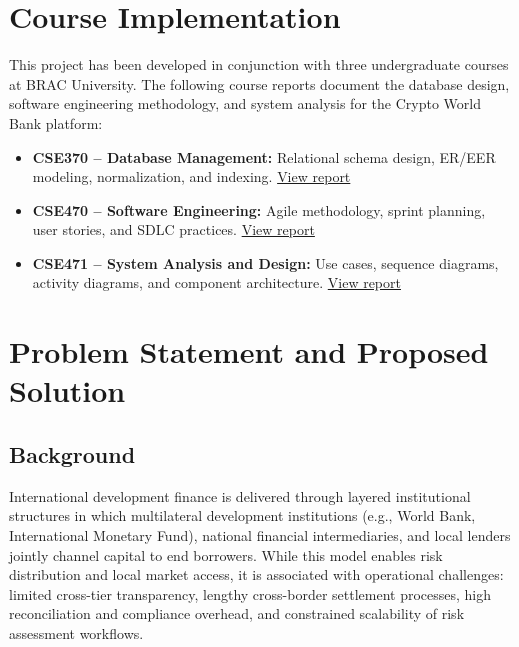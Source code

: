 \documentclass[11pt,a4paper]{article}
\begin{document}
\section{Course Implementation}

This project has been developed in conjunction with three undergraduate courses at BRAC University. The following course reports document the database design, software engineering methodology, and system analysis for the Crypto World Bank platform:

\begin{itemize}[noitemsep]
\item \textbf{CSE370 -- Database Management:} Relational schema design, ER/EER modeling, normalization, and indexing. \href{https://github.com/Yuvraajrahman/Cryto-World-Bank/blob/main/Documentation/CSE370_DATABASE_MANAGEMENT\%20REPORT.md}{View report}
\item \textbf{CSE470 -- Software Engineering:} Agile methodology, sprint planning, user stories, and SDLC practices. \href{https://github.com/Yuvraajrahman/Cryto-World-Bank/blob/main/Documentation/CSE470_SOFTWARE_ENGINEERING\%20REPORT.md}{View report}
\item \textbf{CSE471 -- System Analysis and Design:} Use cases, sequence diagrams, activity diagrams, and component architecture. \href{https://github.com/Yuvraajrahman/Cryto-World-Bank/blob/main/Documentation/CSE471_SYSTEM_ANALYSIS_AND_DESIGN\%20REPORT.md}{View report}
\end{itemize}

\section{Problem Statement and Proposed Solution}

\subsection{Background}

International development finance is delivered through layered institutional structures in which multilateral development institutions (e.g., World Bank, International Monetary Fund), national financial intermediaries, and local lenders jointly channel capital to end borrowers. While this model enables risk distribution and local market access, it is associated with operational challenges: limited cross-tier transparency, lengthy cross-border settlement processes, high reconciliation and compliance overhead, and constrained scalability of risk assessment workflows.
\end{document}
